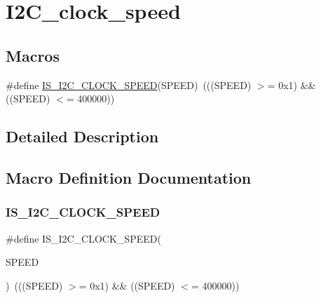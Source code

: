 \hypertarget{group___i2_c__clock__speed}{}\section{I2\+C\+\_\+clock\+\_\+speed}
\label{group___i2_c__clock__speed}
\subsection*{Macros}
\begin{DoxyCompactItemize}
\item 
\#define \mbox{\hyperlink{group___i2_c__clock__speed_gae0d731df1b264d853703716c29309b9b}{I\+S\+\_\+\+I2\+C\+\_\+\+C\+L\+O\+C\+K\+\_\+\+S\+P\+E\+ED}}(S\+P\+E\+ED)~(((S\+P\+E\+ED) $>$= 0x1) \&\& ((\+S\+P\+E\+E\+D) $<$= 400000))
\end{DoxyCompactItemize}


\subsection{Detailed Description}


\subsection{Macro Definition Documentation}
\mbox{\label{group___i2_c__clock__speed_gae0d731df1b264d853703716c29309b9b}} 
\subsubsection{\texorpdfstring{IS\_I2C\_CLOCK\_SPEED}{IS\_I2C\_CLOCK\_SPEED}}
{\footnotesize\ttfamily \#define I\+S\+\_\+\+I2\+C\+\_\+\+C\+L\+O\+C\+K\+\_\+\+S\+P\+E\+ED(\begin{DoxyParamCaption}\item[{}]{S\+P\+E\+ED }\end{DoxyParamCaption})~(((S\+P\+E\+ED) $>$= 0x1) \&\& ((\+S\+P\+E\+E\+D) $<$= 400000))}

